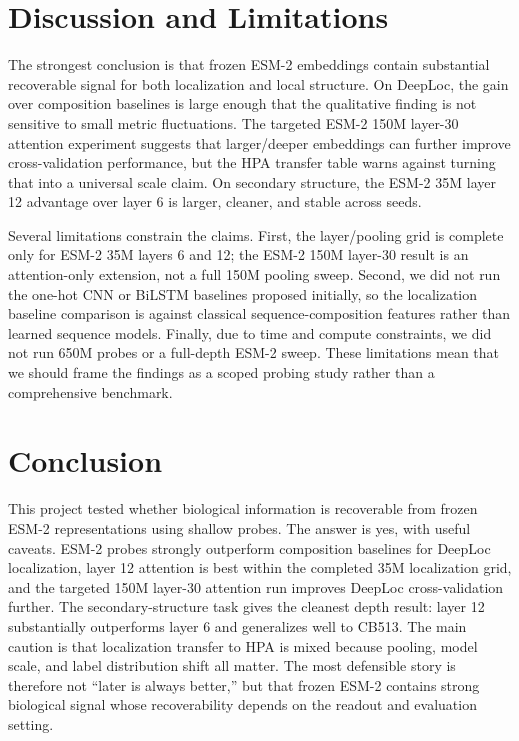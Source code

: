 \documentclass{article}
\begin{document}
\section{Discussion and Limitations}

The strongest conclusion is that frozen ESM-2 embeddings contain substantial recoverable signal for both localization and local structure. On DeepLoc, the gain over composition baselines is large enough that the qualitative finding is not sensitive to small metric fluctuations. The targeted ESM-2 150M layer-30 attention experiment suggests that larger/deeper embeddings can further improve cross-validation performance, but the HPA transfer table warns against turning that into a universal scale claim. On secondary structure, the ESM-2 35M layer 12 advantage over layer 6 is larger, cleaner, and stable across seeds.

Several limitations constrain the claims. First, the layer/pooling grid is complete only for ESM-2 35M layers 6 and 12; the ESM-2 150M layer-30 result is an attention-only extension, not a full 150M pooling sweep. 
Second, we did not run the one-hot CNN or BiLSTM baselines proposed initially, so the localization baseline comparison is against classical sequence-composition features rather than learned sequence models. 
Finally, due to time and compute constraints, we did not run 650M probes or a full-depth ESM-2 sweep. 
These limitations mean that we should frame the findings as a scoped probing study rather than a comprehensive benchmark.

\section{Conclusion}

This project tested whether biological information is recoverable from frozen ESM-2 representations using shallow probes. The answer is yes, with useful caveats. ESM-2 probes strongly outperform composition baselines for DeepLoc localization, layer 12 attention is best within the completed 35M localization grid, and the targeted 150M layer-30 attention run improves DeepLoc cross-validation further. The secondary-structure task gives the cleanest depth result: layer 12 substantially outperforms layer 6 and generalizes well to CB513. The main caution is that localization transfer to HPA is mixed because pooling, model scale, and label distribution shift all matter. The most defensible story is therefore not ``later is always better,'' but that frozen ESM-2 contains strong biological signal whose recoverability depends on the readout and evaluation setting.



\end{document}
